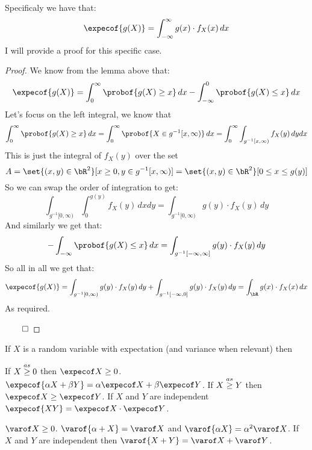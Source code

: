Specificaly we have that:
\[ \expecof{g(X)} = \int_{-\infty}^\infty g(x)\cdot f_X(x)\,dx \]
I will provide a proof for this specific case.

\begin{proof}

	We know from the lemma above that:
	\[ \expecof{g(X)} = \int_0^\infty \probof{g(X)\geq x}\,dx - \int_{-\infty}^0 \probof{g(X)\leq x}\,dx \]
	Let's focus on the left integral, we know that
	\[ \int_0^\infty\probof{g(X)\geq x}\,dx = \int_0^\infty\probof{X\in g^{-1}[x,\infty)}\,dx = \int_0^\infty\int_{g^{-1}[x,\infty)}f_X(y)\,dydx \]
	This is just the integral of $f_X(y)$ over the set
	\[ A = \set{(x,y)\in\bR^2}[x\geq0, y\in g^{-1}[x,\infty)] = \set{(x,y)\in\bR^2}[0\leq x\leq g(y)] \]
	So we can swap the order of integration to get:
	\[ \int_{g^{-1}[0,\infty)}\int_0^{g(y)} f_X(y)\,dxdy = \int_{g^{-1}[0,\infty)}g(y)\cdot f_X(y)\,dy \]
	And similarly we get that:
	\[ -\int_{-\infty}\probof{g(X)\leq x}\,dx = \int_{g^{-1}[-\infty,\infty]}g(y)\cdot f_X(y)\,dy \]
	So all in all we get that:
	\[ \expecof{g(X)} = \int_{g^{-1}[0,\infty)}g(y)\cdot f_X(y)\,dy + \int_{g^{-1}[-\infty,0]}g(y)\cdot f_X(y)\,dy =
	\int_\bR g(x)\cdot f_X(x)\,dx \]
	As required.

	\hfill$\qed$

\end{proof}

\begin{thrm*}

	If $X$ is a random variable with expectation (and variance when relevant) then
	\begin{msecenumerate}
		\mitem If $X\mathrel{\overset{as}\geq}0$ then $\expecof X\geq0$.
		\mitem $\expecof{\alpha X+\beta Y}=\alpha\expecof X+\beta\expecof Y$.
		\mitem If $X\mathrel{\overset{as}\geq} Y$ then $\expecof X\geq\expecof Y$.
		\mitem If $X$ and $Y$ are independent $\expecof{XY}=\expecof X\cdot\expecof Y$.

		\mitem $\varof X\geq0$.
		\mitem $\varof{\alpha + X}=\varof X$ and $\varof{\alpha X}=\alpha^2\varof X$.
		\mitem If $X$ and $Y$ are independent then $\varof{X+Y}=\varof X+\varof Y$.
	\end{msecenumerate}

\end{thrm*}

